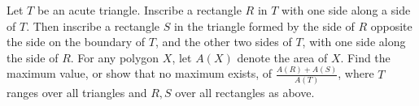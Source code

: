 Let $T$ be an acute triangle. Inscribe a rectangle $R$ in $T$ with one
side along a side of $T$. Then inscribe a rectangle $S$ in the triangle
formed by the side of $R$ opposite the side on the boundary of $T$,
and the other two sides of $T$, with one side along the side of
$R$. For any polygon $X$, let $A(X)$ denote the area of $X$. Find the
maximum value, or show that no maximum exists, of
$\frac{A(R)+A(S)}{A(T)}$, where $T$ ranges over all triangles and
$R,S$ over all rectangles as above.
